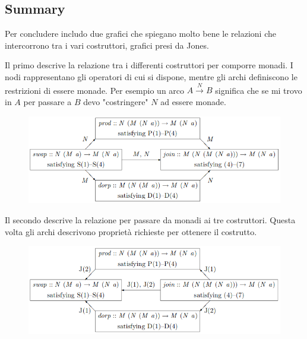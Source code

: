 \subsection{Summary}
\label{composing_monads_summary}

Per concludere includo due grafici che spiegano molto bene le relazioni che
intercorrono tra i vari costruttori, grafici presi da Jones\cite{jones0}.\newline

Il primo descrive la relazione tra i differenti costruttori per comporre monadi.
I nodi rappresentano gli operatori di cui si dispone, mentre gli archi
definiscono le restrizioni di essere monade. Per esempio un arco
$A\overset{N}{\longrightarrow}B$ significa che se mi trovo in $A$ per passare a $B$
devo "costringere" $N$ ad essere monade.
\begin{figure}[H]
  \includegraphics[width=\linewidth]{./img/graph_1}
  \label{fig:graph_1}
\end{figure}
Il secondo descrive la relazione per passare da monadi ai tre costruttori.
Questa volta gli archi descrivono proprietà richieste per ottenere il costrutto.
\begin{figure}[H]
  \includegraphics[width=\linewidth]{./img/graph_2}
  \label{fig:graph_2}
\end{figure}